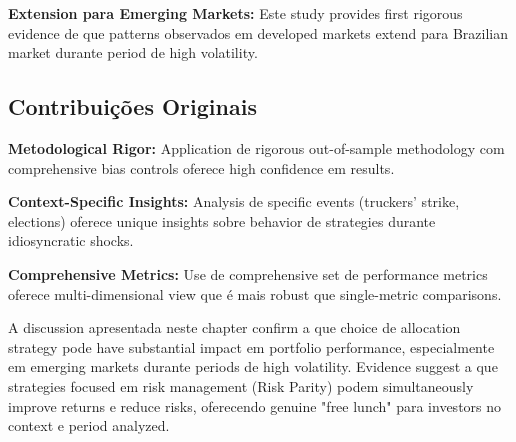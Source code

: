\textbf{Extension para Emerging Markets:} Este study provides first rigorous evidence de que patterns observados em developed markets extend para Brazilian market durante period de high volatility.

\subsection{Contribuições Originais}

\textbf{Metodological Rigor:} Application de rigorous out-of-sample methodology com comprehensive bias controls oferece high confidence em results.

\textbf{Context-Specific Insights:} Analysis de specific events (truckers' strike, elections) oferece unique insights sobre behavior de strategies durante idiosyncratic shocks.

\textbf{Comprehensive Metrics:} Use de comprehensive set de performance metrics oferece multi-dimensional view que é mais robust que single-metric comparisons.

A discussion apresentada neste chapter confirm a que choice de allocation strategy pode have substantial impact em portfolio performance, especialmente em emerging markets durante periods de high volatility. Evidence suggest a que strategies focused em risk management (Risk Parity) podem simultaneously improve returns e reduce risks, oferecendo genuine "free lunch" para investors no context e period analyzed.